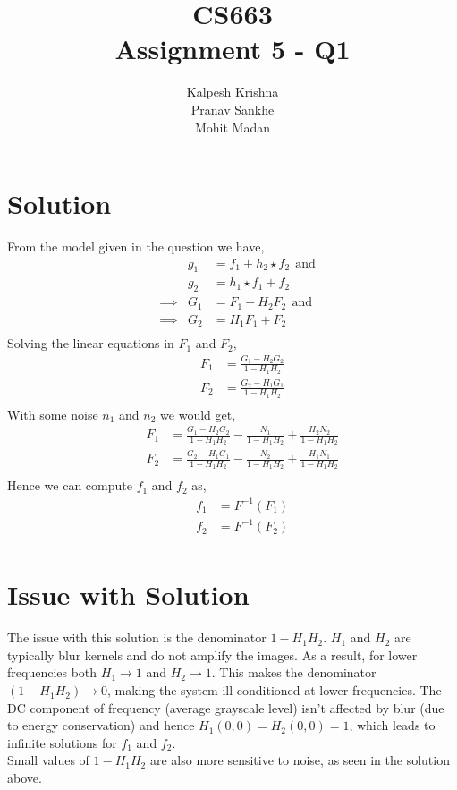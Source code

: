 \documentclass[11pt]{article}
\title{\textbf{CS663 \\ Assignment 5 - Q1}}
\author{Kalpesh Krishna\\ Pranav Sankhe \\ Mohit Madan}
\date{}
\begin{document}
\maketitle
\section{Solution}
From the model given in the question we have,
\begin{align*}
&&g_1 &= f_1 + h_2 \star f_2~~\text{and}\\
&&g_2 &= h_1 \star f_1 + f_2 \\
&\implies & G_1 &= F_1 + H_2F_2~~\text{and} \\
&\implies & G_2 &= H_1 F_1 + F_2 \\
\end{align*}
Solving the linear equations in $F_1$ and $F_2$,
\begin{align*}
&&F_1 &= \frac{G_1 - H_2G_2}{1-H_1H_2}\\
&&F_2 &= \frac{G_2 - H_1G_1}{1-H_1H_2} \\
\end{align*}
With some noise $n_1$ and $n_2$ we would get,
\begin{align*}
&&F_1 &= \frac{G_1 - H_2G_2}{1-H_1H_2} - \frac{N_1}{1-H_1H_2} + \frac{H_2N_2}{1-H_1H_2}\\
&&F_2 &= \frac{G_2 - H_1G_1}{1-H_1H_2} - \frac{N_2}{1-H_1H_2} + \frac{H_1N_1}{1-H_1H_2}\\
\end{align*}
Hence we can compute $f_1$ and $f_2$ as,
\begin{align*}
&&f_1 &= F^{-1}(F_1)\\
&&f_2 &= F^{-1}(F_2)\\
\end{align*}
\section{Issue with Solution}
The issue with this solution is the denominator $1-H_1H_2$. $H_1$ and $H_2$ are typically blur kernels and do not amplify the images. As a result, for lower frequencies both $H_1 \rightarrow 1$ and $H_2 \rightarrow 1$. This makes the denominator $(1-H_1H_2) \rightarrow 0$, making the system ill-conditioned at lower frequencies. The DC component of frequency (average grayscale level) isn't affected by blur (due to energy conservation) and hence $H_1(0,0) = H_2(0,0) = 1$, which leads to infinite solutions for $f_1$ and $f_2$.\\Small values of $1-H_1H_2$ are also more sensitive to noise, as seen in the solution above.
\end{document}
